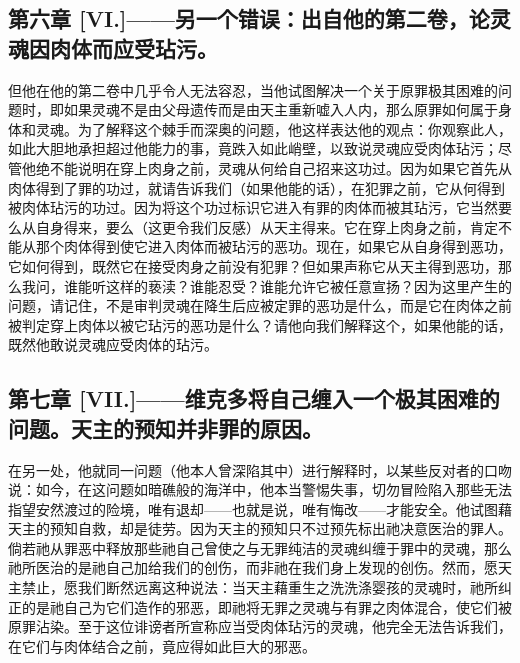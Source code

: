 
\subsection{第六章 [VI.]——另一个错误：出自他的第二卷，论灵魂因肉体而应受玷污。}

但他在他的第二卷中几乎令人无法容忍，当他试图解决一个关于原罪极其困难的问题时，即如果灵魂不是由父母遗传而是由天主重新嘘入人内，那么原罪如何属于身体和灵魂。为了解释这个棘手而深奥的问题，他这样表达他的观点：你观察此人，如此大胆地承担超过他能力的事，竟跌入如此峭壁，以致说灵魂应受肉体玷污；尽管他绝不能说明在穿上肉身之前，灵魂从何给自己招来这功过。因为如果它首先从肉体得到了罪的功过，就请告诉我们（如果他能的话），在犯罪之前，它从何得到被肉体玷污的功过。因为将这个功过标识它进入有罪的肉体而被其玷污，它当然要么从自身得来，要么（这更令我们反感）从天主得来。它在穿上肉身之前，肯定不能从那个肉体得到使它进入肉体而被玷污的恶功。现在，如果它从自身得到恶功，它如何得到，既然它在接受肉身之前没有犯罪？但如果声称它从天主得到恶功，那么我问，谁能听这样的亵渎？谁能忍受？谁能允许它被任意宣扬？因为这里产生的问题，请记住，不是审判灵魂在降生后应被定罪的恶功是什么，而是它在肉体之前被判定穿上肉体以被它玷污的恶功是什么？请他向我们解释这个，如果他能的话，既然他敢说灵魂应受肉体的玷污。\par


\subsection{第七章 [VII.]——维克多将自己缠入一个极其困难的问题。天主的预知并非罪的原因。}

在另一处，他就同一问题（他本人曾深陷其中）进行解释时，以某些反对者的口吻说：如今，在这问题如暗礁般的海洋中，他本当警惕失事，切勿冒险陷入那些无法指望安然渡过的险境，唯有退却——也就是说，唯有悔改——才能安全。他试图藉天主的预知自救，却是徒劳。因为天主的预知只不过预先标出祂决意医治的罪人。倘若祂从罪恶中释放那些祂自己曾使之与无罪纯洁的灵魂纠缠于罪中的灵魂，那么祂所医治的是祂自己加给我们的创伤，而非祂在我们身上发现的创伤。然而，愿天主禁止，愿我们断然远离这种说法：当天主藉重生之洗洗涤婴孩的灵魂时，祂所纠正的是祂自己为它们造作的邪恶，即祂将无罪之灵魂与有罪之肉体混合，使它们被原罪沾染。至于这位诽谤者所宣称应当受肉体玷污的灵魂，他完全无法告诉我们，在它们与肉体结合之前，竟应得如此巨大的邪恶。\par

